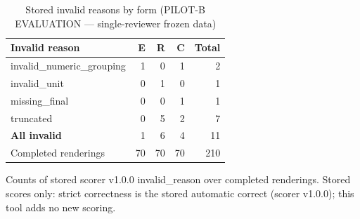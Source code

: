 \begin{table}[t]
\centering
\small
\caption{Stored invalid reasons by form (PILOT-B EVALUATION --- single-reviewer frozen data)}
\label{tab:pilotb-Llama-3.2-3B-Instruct-invalid}
\begin{tabular}{lrrrr}
\toprule
Invalid reason & E & R & C & Total \\
\midrule
invalid\_numeric\_grouping & 1 & 0 & 1 & 2 \\
invalid\_unit & 0 & 1 & 0 & 1 \\
missing\_final & 0 & 0 & 1 & 1 \\
truncated & 0 & 5 & 2 & 7 \\
\textbf{All invalid} & 1 & 6 & 4 & 11 \\
Completed renderings & 70 & 70 & 70 & 210 \\
\bottomrule
\end{tabular}
\par\smallskip
\parbox{\linewidth}{\footnotesize Counts of stored scorer v1.0.0 invalid\_reason over completed renderings. Stored scores only: strict correctness is the stored automatic correct (scorer v1.0.0); this tool adds no new scoring.}
\end{table}
